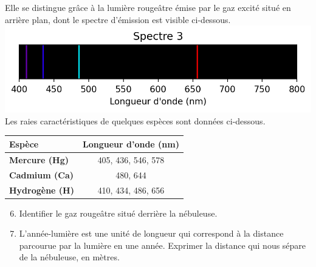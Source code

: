 \documentclass[12pt,a4paper,fleqn]{article}
\begin{document}
{\begin{multicols}{2}
Elle se distingue grâce à la lumière rougeâtre émise par le gaz excité situé en arrière plan, dont le spectre d'émission est visible ci-dessous.
\includegraphics[width=\linewidth, trim=0 0 0 20, clip]{images/spectrum_H_anon.png}
Les raies caractéristiques de quelques espèces sont données ci-dessous.
\begin{center}
\begin{tabular}{l|c}
\textbf{Espèce} & \textbf{Longueur d'onde (nm)} \\
\hline \hline
\textbf{Mercure (Hg)} & 405, 436, 546, 578 \\
\textbf{Cadmium (Ca)} & 480, 644 \\
\textbf{Hydrogène (H)} & 410, 434, 486, 656 \\
\end{tabular}
\end{center}
\end{multicols}

\begin{enumerate}
\setcounter{enumi}{5}
\item \app{} \anarai{}

Identifier le gaz rougeâtre situé derrière la nébuleuse.

\item \rco{} \rea{}

L'année-lumière est une unité de longueur qui correspond à la distance parcourue par la lumière en une année.
Exprimer la distance qui nous sépare de la nébuleuse, en mètres.
\end{enumerate}
}

\horsehead

\horsehead
\end{document}
